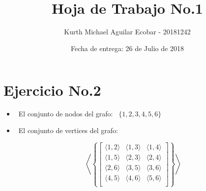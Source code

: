 \documentclass[10pt,a4paper]{article}
\begin{document}
\title{Hoja de Trabajo No.1 }
\author{Kurth Michael Aguilar Ecobar - 20181242}
\date{Fecha de entrega: 26 de Julio de 2018 }
\maketitle
\section*{Ejercicio No.2}
\begin{itemize}
\item \ El conjunto de nodos del grafo: \ $ \lbrace 1,2,3,4,5,6 \rbrace$
\item \ El conjunto de vertices del grafo: 


    $$
        \left\langle \left\{
            \begin{bmatrix}
                \langle 1,2 \rangle & \langle 1,3 \rangle & \langle 1,4 \rangle \\
                \langle 1,5 \rangle & \langle 2,3 \rangle & \langle 2,4 \rangle \\
                \langle 2,6 \rangle & \langle 3,5 \rangle & \langle 3,6 \rangle \\
                \langle 4,5 \rangle & \langle 4,6 \rangle & \langle 5,6 \rangle \\
            \end{bmatrix}
        \right\} \right\rangle
    $$ 
 
\end{itemize}
\end{document}
